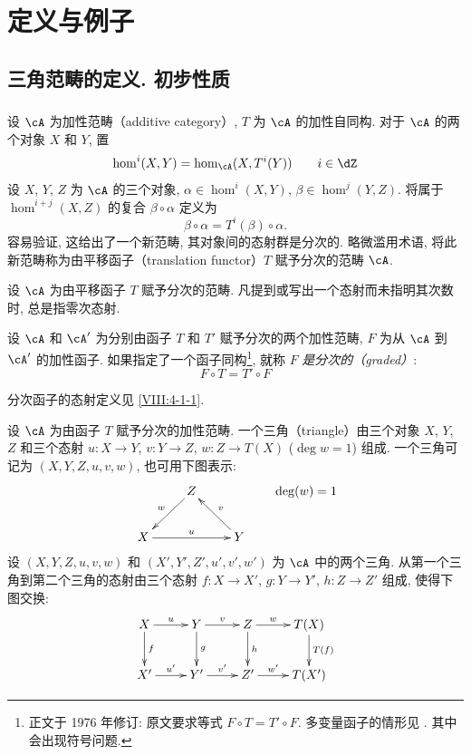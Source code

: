 \section{定义与例子}\label{VIII:1}

\subsection{三角范畴的定义. 初步性质}\label{VIII:1-1}

\addtocounter{subsubsection}{-1}
\subsubsection{}\label{VIII:1-1-0}

设 $\cA$ 为加性范畴（additive category）, $T$ 为 $\cA$ 的加性自同构. 对于 $\cA$ 的两个对象 $X$ 和 $Y$, 置
\[
  \hom^i(X,Y) = \hom_\cA(X,T^i(Y)) \qquad i\in \dZ
\]
设 $X$, $Y$, $Z$ 为 $\cA$ 的三个对象, $\alpha\in \hom^i(X,Y)$, $\beta\in \hom^j(Y,Z)$. 将属于 $\hom^{i+j}(X,Z)$ 的复合 $\beta\circ\alpha$ 定义为
\[
  \beta\circ \alpha = T^i(\beta)\circ\alpha \text{.}
\]
容易验证, 这给出了一个新范畴, 其对象间的态射群是分次的. 略微滥用术语, 将此新范畴称为由平移函子（translation functor）$T$ 赋予分次的范畴 $\cA$.

设 $\cA$ 为由平移函子 $T$ 赋予分次的范畴. 凡提到或写出一个态射而未指明其次数时, 总是指零次态射.

设 $\cA$ 和 $\cA'$ 为分别由函子 $T$ 和 $T'$ 赋予分次的两个加性范畴, $F$ 为从 $\cA$ 到 $\cA'$ 的加性函子. 如果指定了一个函子同构\footnote{正文于 1976 年修订: 原文要求等式 $F\circ T=T'\circ F$. 多变量函子的情形见 \cite[XVII 0.3]{sga4}. 其中会出现符号问题.}, 就称 $F$ \emph{是分次的（graded）}:
\[
  F\circ T = T'\circ F
\]

分次函子的态射定义见 \ref{VIII:4-1-1}.

设 $\cA$ 为由函子 $T$ 赋予分次的加性范畴. 一个三角（triangle）由三个对象 $X$, $Y$, $Z$ 和三个态射 $u:X\to Y$, $v:Y\to Z$, $w:Z\to T(X)$ ($\deg w=1$) 组成. 一个三角可记为 $(X,Y,Z,u,v,w)$, 也可用下图表示:
\[\xymatrix{
  & Z \ar[dl]_-w \\
  X \ar[rr]^-u
    & & Y \ar[lu]_-v
}\qquad \deg(w)=1
\]
设 $(X,Y,Z,u,v,w)$ 和 $(X',Y',Z',u',v',w')$ 为 $\cA$ 中的两个三角. 从第一个三角到第二个三角的态射由三个态射 $f:X\to X'$, $g:Y\to Y'$, $h:Z\to Z'$ 组成, 使得下图交换:
\[\xymatrix{
  X \ar[r]^-u \ar[d]^-f
    & Y \ar[r]^-v \ar[d]^-g
    & Z \ar[r]^-w \ar[d]^-h
    & T(X) \ar[d]^-{T(f)} \\
  X' \ar[r]^-{u'}
    & Y' \ar[r]^-{v'}
    & Z' \ar[r]^-{w'}
    & T(X')
}\]

